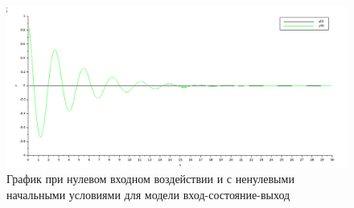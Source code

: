 \documentclass[12pt, a4paper] {ncc}
\begin{document}
		\begin{figure}[ht]
    		\includegraphics[scale=0.4]{./plotiosfree.png}
			\caption{График при нулевом входном воздействии и с ненулевыми начальными условиями для модели вход-состояние-выход}
		\end{figure}


\end{document}
